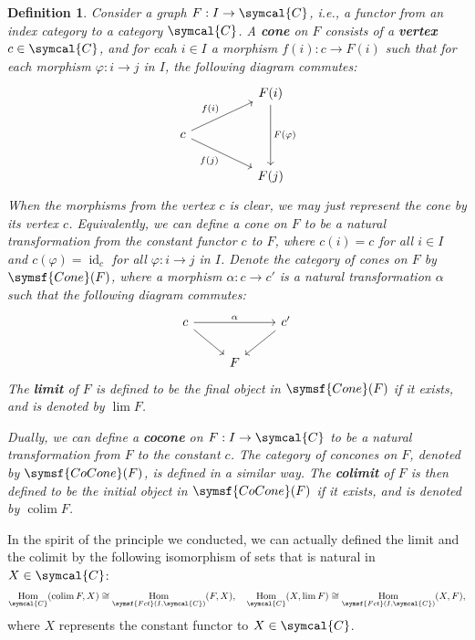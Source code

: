 \documentclass{article}
\theoremstyle{theorem}
\newtheorem{definition}{Definition}[section]
\theoremstyle{remark}
\def\calC{{\symcal{C}}}
\DeclareMathOperator{\Hom}{Hom}
\DeclareMathOperator{\id}{id}
\DeclareMathOperator*{\colim}{colim}
\begin{document}
\begin{definition}
    Consider a graph $F : I \to \calC$, i.e., a functor from an index category to a category $\calC$. A \textbf{cone} on $F$ consists of a \textbf{vertex} $c \in \calC$, and for ecah $i \in I$ a morphism $f(i) : c \to F(i)$ such that for each morphism $\varphi : i \to j$ in $I$, the following diagram commutes:
    $$\begin{tikzcd}
        && {F(i)} \\
        c \\
        && {F(j)}
        \arrow["{F(\varphi)}", from=1-3, to=3-3]
        \arrow["{f(i)}", from=2-1, to=1-3]
        \arrow["{f(j)}"', from=2-1, to=3-3]
    \end{tikzcd}$$
    When the morphisms from the vertex $c$ is clear, we may just represent the cone by its vertex $c$. Equivalently, we can define a cone on $F$ to be a natural transformation from the constant functor $c$ to $F$, where $c(i) = c$ for all $i \in I$ and $c(\varphi) = \id_c$ for all $\varphi : i \to j$ in $I$. Denote the category of cones on $F$ by $\symsf{Cone}(F)$, where a morphism $\alpha : c \to c'$ is a natural transformation $\alpha$ such that the following diagram commutes:
    $$\begin{tikzcd}
        c && {c'} \\
        & F
        \arrow["\alpha", from=1-1, to=1-3]
        \arrow[from=1-1, to=2-2]
        \arrow[from=1-3, to=2-2]
    \end{tikzcd}$$
    The \textbf{limit} of $F$ is defined to be the final object in $\symsf{Cone}(F)$ if it exists, and is denoted by $\lim F$. 

    Dually, we can define a \textbf{cocone} on $F : I \to \calC$ to be a natural transformation from $F$ to the constant $c$. The category of concones on $F$, denoted by $\symsf{CoCone}(F)$, is defined in a similar way. The \textbf{colimit} of $F$ is then defined to be the initial object in $\symsf{CoCone}(F)$ if it exists, and is denoted by $\colim F$. 
\end{definition}

In the spirit of the principle we conducted, we can actually defined the limit and the colimit by the following isomorphism of sets that is natural in $X \in \calC$: $$\Hom_\calC(\colim F, X) \cong \Hom_{\symsf{Fct}(I, \calC)}(F, X), \quad \Hom_\calC(X, \lim F) \cong \Hom_{\symsf{Fct}(I, \calC)}(X, F),$$ where $X$ represents the constant functor to $X \in \calC$. 
\end{document}

